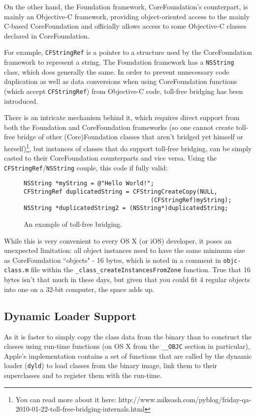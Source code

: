 On the other hand, the Foundation framework, CoreFoundation's counterpart, is mainly an Objective-C framework, providing object-oriented access to the mainly C-based CoreFoundation and officially allows access to some Objective-C classes declared in CoreFoundation.

For example, \verb=CFStringRef= is a pointer to a structure used by the CoreFoundation framework to represent a string. The Foundation framework has a \verb=NSString= class, which does generally the same. In order to prevent unnecessary code duplication as well as data conversions when using CoreFoundation functions (which accept \verb=CFStringRef=) from Objective-C code, toll-free bridging has been introduced.

There is an intricate mechanism behind it, which requires direct support from both the Foundation and CoreFoundation frameworks (so one cannot create toll-free bridge of other (Core)Foundation classes that aren't bridged yet himself or herself)\footnote{You can read more about it here: http://www.mikeash.com/pyblog/friday-qa-2010-01-22-toll-free-bridging-internals.html}, but instances of classes that do support toll-free bridging, can be simply casted to their CoreFoundation counterparts and vice versa. Using the \verb=CFStringRef=/\verb=NSString= couple, this code if fully valid:

\begin{figure}[H]
\begin{verbatim}
NSString *myString = @"Hello World!";
CFStringRef duplicatedString = CFStringCreateCopy(NULL, 
                                    (CFStringRef)myString);
NSString *duplicatedString2 = (NSString*)duplicatedString;
\end{verbatim}
  \centering{}
  \caption{An example of toll-free bridging.}
  \label{fig:toll_free_bridging}
\end{figure}

While this is very convenient to every OS X (or iOS) developer, it poses an unexpected limitation: all object instances need to have the same minimum size as CoreFoundation ``objects" - 16 bytes, which is noted in a comment in \verb=objc-class.m= file within the \verb=_class_createInstancesFromZone= function. True that 16 bytes isn't that much in these days, but given that you could fit 4 regular objects into one on a 32-bit computer, the space adds up.

\subsection{Dynamic Loader Support}
As it is faster to simply copy the class data from the binary than to construct the classes using run-time functions (on OS X from the \verb=__OBJC= section in particular), Apple's implementation contains a set of functions that are called by the dynamic loader (\verb=dyld=) to load classes from the binary image, link them to their superclasses and to register them with the run-time.

